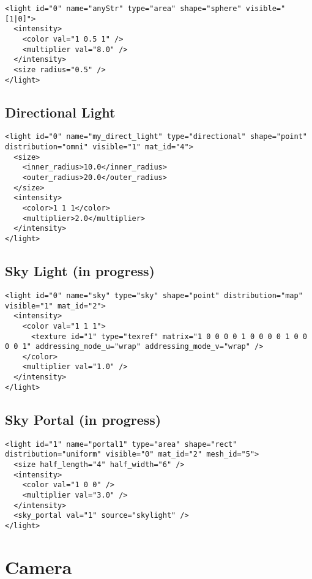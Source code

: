 \documentclass[a4paper,11pt]{report}
\begin{document}
\lstset{language=XML}
\begin{lstlisting}
<light id="0" name="anyStr" type="area" shape="sphere" visible="[1|0]">
  <intensity>
    <color val="1 0.5 1" />
    <multiplier val="8.0" />
  </intensity>
  <size radius="0.5" />
</light>
\end{lstlisting}

\subsection{Directional Light}
\lstset{language=XML}
\begin{lstlisting}
<light id="0" name="my_direct_light" type="directional" shape="point" distribution="omni" visible="1" mat_id="4">
  <size>
    <inner_radius>10.0</inner_radius>
    <outer_radius>20.0</outer_radius>
  </size>
  <intensity>
    <color>1 1 1</color>
    <multiplier>2.0</multiplier>
  </intensity>
</light>
\end{lstlisting}

\subsection{Sky Light (in progress)}
\lstset{language=XML}
\begin{lstlisting}
<light id="0" name="sky" type="sky" shape="point" distribution="map" visible="1" mat_id="2">
  <intensity>
    <color val="1 1 1">
      <texture id="1" type="texref" matrix="1 0 0 0 0 1 0 0 0 0 1 0 0 0 0 1" addressing_mode_u="wrap" addressing_mode_v="wrap" />
    </color>
    <multiplier val="1.0" />
  </intensity>
</light>
\end{lstlisting}


\subsection{Sky Portal (in progress)}
\lstset{language=XML}
\begin{lstlisting}
<light id="1" name="portal1" type="area" shape="rect" distribution="uniform" visible="0" mat_id="2" mesh_id="5">
  <size half_length="4" half_width="6" />
  <intensity>
    <color val="1 0 0" />
    <multiplier val="3.0" />
  </intensity>
  <sky_portal val="1" source="skylight" />
</light>
\end{lstlisting}

\section{Camera}
\end{document}
